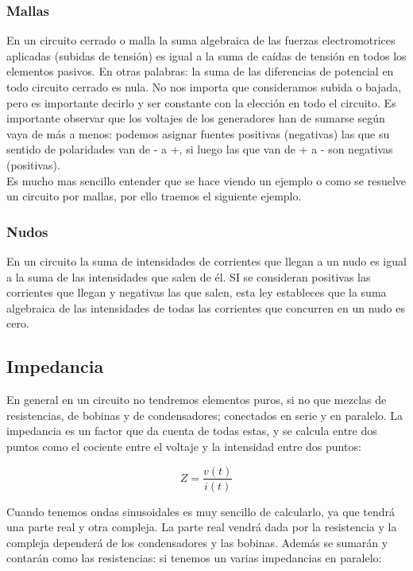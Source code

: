 \documentclass[12pt,a4paper]{article}
\begin{document}
\subsubsection{Mallas}

En un circuito cerrado o malla la suma algebraica de las fuerzas electromotrices aplicadas (subidas de tensión) es igual a la suma de caídas de tensión en todos los elementos pasivos. En otras palabras: la suma de las diferencias de potencial en todo circuito cerrado es nula. No nos importa que consideramos subida o bajada, pero es importante decirlo y ser constante con la elección en todo el circuito. Es importante observar que los voltajes de los generadores han de sumarse según vaya de más a menos: podemos asignar fuentes positivas (negativas) las que su sentido de polaridades van de - a +, si luego las que van de + a - son negativas (positivas). \\

Es mucho mas sencillo entender que se hace viendo un ejemplo o como se resuelve un circuito por mallas, por ello traemos el siguiente ejemplo.

\subsubsection{Nudos}

En un circuito la suma de intensidades de corrientes que llegan a un nudo es igual a la suma de las intensidades que salen de él. SI se consideran positivas las corrientes que llegan y negativas las que salen, esta ley estableces que la suma algebraica de las intensidades de todas las corrientes que concurren en un nudo es cero. 


\subsection{Impedancia}

En general en un circuito no tendremos elementos puros, si no que mezclas de resistencias, de bobinas y de condensadores; conectados en serie y en paralelo. La impedancia es un factor que da cuenta de todas estas, y se calcula entre dos puntos como el cociente entre el voltaje y la intensidad entre dos puntos:

\begin{equation}
Z = \dfrac{v(t)}{i(t)}
\end{equation}

 Cuando tenemos ondas sinusoidales es muy sencillo de calcularlo, ya que tendrá una parte real y otra compleja. La parte real vendrá dada por la resistencia y la compleja dependerá de los condensadores y las bobinas. Además se sumarán y contarán como las resistencias: si tenemos un varias impedancias en paralelo:
\end{document}
